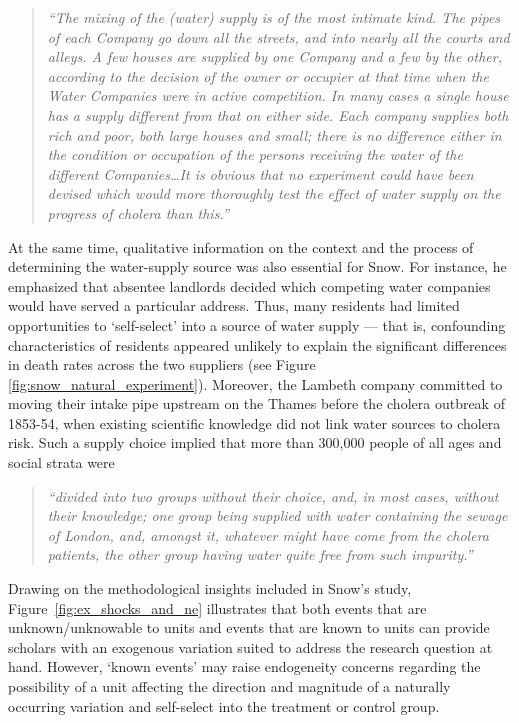 \documentclass[11pt]{article}
\begin{document}
\begin{refsection}
\begin{quote}
  \textit{
  ``The mixing of the (water) supply is of the most intimate kind. The pipes of
  each Company go down all the streets, and into nearly all the courts and
  alleys. A few houses are supplied by one Company and a few by the other,
  according to the decision of the owner or occupier at that time when the Water
  Companies were in active competition. In many cases a single house has a
  supply different from that on either side. Each company supplies both rich and
  poor, both large houses and small; there is no difference either in the
  condition or occupation of the persons receiving the water of the different
  Companies\ldots It is obvious that no experiment could have been devised which
  would more thoroughly test the effect of water supply on the progress of
  cholera than this.''
  }
  \autocite[][pages 74 - 75]{snow_1855}
\end{quote}

At the same time, qualitative information on the context and the process of determining the water-supply source was also essential for Snow.  For instance, he emphasized that absentee landlords decided which competing water companies would have served a particular address.  Thus, many residents had limited opportunities to `self-select' into a source of water supply --- that is, confounding characteristics of residents appeared unlikely to explain the significant differences in death rates across the two suppliers (see Figure \ref{fig:snow_natural_experiment}).  Moreover,  the Lambeth company committed to moving their intake pipe upstream on the Thames before the cholera outbreak of 1853-54, when existing scientific knowledge did not link water sources to cholera risk.  Such a supply choice implied that more than 300,000 people of all ages and social strata were

\begin{quote}
  \textit{``divided into two groups without their choice, and, in most cases, 
  without their knowledge; one group being supplied with water containing the 
  sewage of London, and, amongst it, whatever might have come from the cholera 
  patients, the other group having water quite free from such impurity.''}
  \autocite[][pages 74-75]{snow_1855}
\end{quote}

Drawing on the methodological insights included in Snow's study,  Figure~\ref{fig:ex_shocks_and_ne} illustrates that both events that are unknown/unknowable to units and events that are known to units can provide scholars with an exogenous variation suited to address the research question at hand.  However, `known events' may raise endogeneity concerns regarding the possibility of a unit affecting the direction and magnitude of a naturally occurring variation and self-select into the treatment or control group.


\end{refsection}
\end{document}
